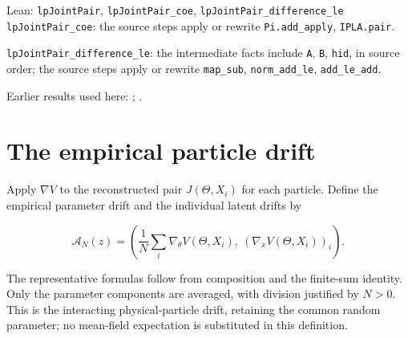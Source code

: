 \documentclass[11pt,a4paper]{article}
\begin{document}
\begin{leanbox}{Lean: \texttt{lpJointPair}, \texttt{lpJointPair\_\allowbreak{}coe}, \texttt{lpJointPair\_\allowbreak{}difference\_\allowbreak{}le}}
\texttt{lp\allowbreak{}Joint\allowbreak{}Pair\_\allowbreak{}coe}: the source steps apply or rewrite \texttt{Pi.\allowbreak{}add\_\allowbreak{}apply}, \texttt{IPLA.\allowbreak{}pair}.



\texttt{lp\allowbreak{}Joint\allowbreak{}Pair\_\allowbreak{}difference\_\allowbreak{}le}: the intermediate facts include \texttt{A}, \texttt{B}, \texttt{hid}, in source order; the source steps apply or rewrite \texttt{map\_\allowbreak{}sub}, \texttt{norm\_\allowbreak{}add\_\allowbreak{}le}, \texttt{add\_\allowbreak{}le\_\allowbreak{}add}.
\end{leanbox}


Earlier results used here: \cite[Section~3.1.1]{LangevinLean2026IPLA}; \cite[Section~3.3.1]{LangevinLean2026IPLA}.

\section{\texorpdfstring{The empirical particle drift}{The empirical particle drift}}


Apply \(\nabla V\) to the reconstructed pair \(J(\Theta,X_i)\) for each particle. Define the empirical parameter drift and the individual latent drifts by

\[\mathcal A_N(z)=\left(\frac1N\sum_i\nabla_\theta V(\Theta,X_i),\ (\nabla_xV(\Theta,X_i))_i\right).\]

The representative formulas follow from composition and the finite-sum identity. Only the parameter components are averaged, with division justified by \(N>0\). This is the interacting physical-particle drift, retaining the common random parameter; no mean-field expectation is substituted in this definition.
\end{document}
